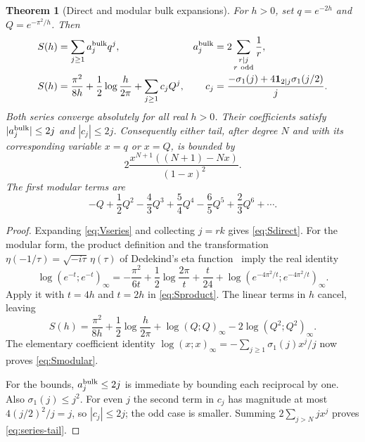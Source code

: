 \documentclass[11pt,a4paper]{article}
\newtheorem{theorem}{Theorem}[section]
\theoremstyle{definition}
\theoremstyle{remark}
\begin{document}
\begin{theorem}[Direct and modular bulk expansions]
\label{thm:modular}
For $h>0$, set $q=e^{-2h}$ and $Q=e^{-\pi^2/h}$. Then
\begin{align}
 S(h)&=\sum_{j\ge1}a_j^{\rm bulk}q^j,
 &a_j^{\rm bulk}&=2\sum_{\substack{r\mid j\\r\ \mathrm{odd}}}\frac1r,
 \label{eq:Sdirect}\\
 S(h)&=\frac{\pi^2}{8h}+\frac12\log\frac h{2\pi}
       +\sum_{j\ge1}c_jQ^j,
 &c_j&=\frac{-\sigma_1(j)+4\mathbf1_{2\mid j}\sigma_1(j/2)}j.
 \label{eq:Smodular}
\end{align}
Both series converge absolutely for all real $h>0$. Their coefficients
satisfy $|a_j^{\rm bulk}|\le2j$ and $|c_j|\le2j$. Consequently either tail,
after degree $N$ and with its corresponding variable $x=q$ or $x=Q$, is
bounded by
\begin{equation}
 2\frac{x^{N+1}((N+1)-Nx)}{(1-x)^2}.
 \label{eq:series-tail}
\end{equation}
The first modular terms are
\begin{equation}
 -Q+\frac12Q^2-\frac43Q^3+\frac54Q^4-\frac65Q^5+\frac23Q^6+\cdots.
 \label{eq:modularfirst}
\end{equation}
\end{theorem}
\begin{proof}
Expanding \eqref{eq:Vseries} and collecting $j=rk$ gives
\eqref{eq:Sdirect}.
For the modular form, the product definition and the transformation
$\eta(-1/\tau)=\sqrt{-i\tau}\,\eta(\tau)$ of Dedekind's eta
function~\cite[\S23.18]{dlmf23} imply the real identity
\begin{equation}
 \log(e^{-t};e^{-t})_\infty
 =-\frac{\pi^2}{6t}+\frac12\log\frac{2\pi}t+\frac t{24}
 +\log(e^{-4\pi^2/t};e^{-4\pi^2/t})_\infty.
 \label{eq:etamodular}
\end{equation}
Apply it with $t=4h$ and $t=2h$ in \eqref{eq:Sproduct}. The linear terms
in $h$ cancel, leaving
\begin{equation}
 S(h)=\frac{\pi^2}{8h}+\frac12\log\frac h{2\pi}
 +\log(Q;Q)_\infty-2\log(Q^2;Q^2)_\infty.
 \label{eq:Smodularproduct}
\end{equation}
The elementary coefficient identity
$\log(x;x)_\infty=-\sum_{j\ge1}\sigma_1(j)x^j/j$ now proves
\eqref{eq:Smodular}.

For the bounds, $a_j^{\rm bulk}\le2j$ is immediate by bounding each
reciprocal by one. Also $\sigma_1(j)\le j^2$. For even $j$ the second
term in $c_j$ has magnitude at most $4(j/2)^2/j=j$, so $|c_j|\le2j$;
the odd case is smaller. Summing $2\sum_{j>N}jx^j$ proves
\eqref{eq:series-tail}.
\end{proof}
\end{document}
